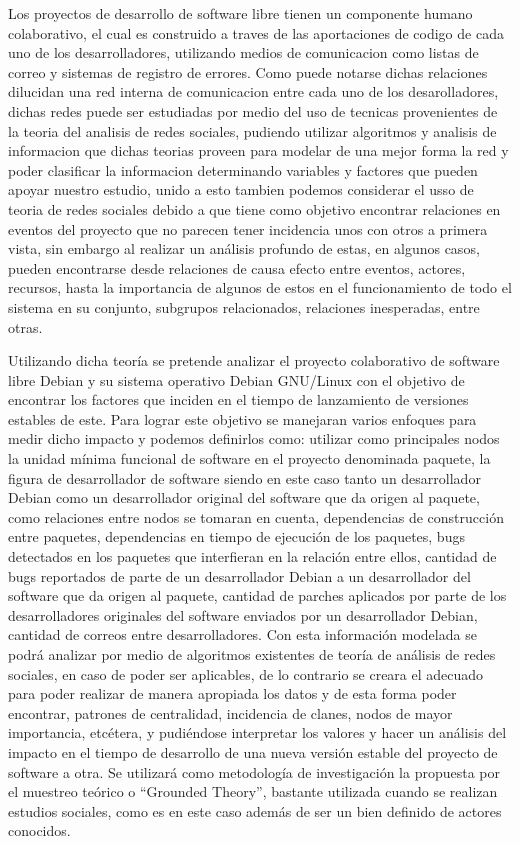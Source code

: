 \documentclass[12pt,titlepage]{report}
\begin{document}
Los proyectos de desarrollo de software libre tienen un componente
humano colaborativo, el cual es construido a traves de las
aportaciones de codigo de cada uno de los desarrolladores, utilizando
medios de comunicacion como listas de correo y sistemas de registro de
errores. Como puede notarse dichas relaciones dilucidan una red
interna de comunicacion entre cada uno de los desarolladores, dichas
redes puede ser estudiadas por medio del uso de tecnicas provenientes
de la teoria del analisis de redes sociales, pudiendo utilizar
algoritmos y analisis de informacion que dichas teorias proveen
para modelar de una mejor forma la red y poder clasificar la
informacion determinando variables y factores que pueden apoyar
nuestro estudio, unido a esto tambien podemos considerar el usso de teoria
de redes sociales  debido a que tiene como objetivo encontrar relaciones en eventos del proyecto que
no parecen tener incidencia unos con otros a primera vista, sin
embargo al realizar un análisis profundo de estas, en algunos casos,
pueden encontrarse desde relaciones de causa efecto entre eventos,
actores, recursos, hasta la importancia de algunos de estos en el
funcionamiento de todo el sistema en su conjunto, subgrupos
relacionados, relaciones inesperadas, entre otras.

Utilizando dicha teoría se pretende analizar el proyecto colaborativo
de software libre Debian y su sistema operativo Debian GNU/Linux con
el objetivo de encontrar los factores que inciden en el tiempo de
lanzamiento de versiones estables de este.  Para lograr este objetivo
se manejaran varios enfoques para medir dicho impacto y podemos
definirlos como: utilizar como principales nodos la unidad mínima
funcional de software en el proyecto denominada paquete, la figura de
desarrollador de software siendo en este caso tanto un desarrollador
Debian como un desarrollador original del software que da origen al
paquete, como relaciones entre nodos se tomaran en cuenta,
dependencias de construcción entre paquetes, dependencias en tiempo de
ejecución de los paquetes, bugs detectados en los paquetes que
interfieran en la relación entre ellos, cantidad de bugs reportados de
parte de un desarrollador Debian a un desarrollador del software que
da origen al paquete, cantidad de parches aplicados por parte de los
desarrolladores originales del software enviados por un desarrollador
Debian, cantidad de correos entre desarrolladores.  Con esta
información modelada se podrá analizar por medio de algoritmos
existentes de teoría de análisis de redes sociales, en caso de poder
ser aplicables, de lo contrario se creara el adecuado para poder
realizar de manera apropiada los datos y de esta forma poder
encontrar, patrones de centralidad, incidencia de clanes, nodos de
mayor importancia, etcétera, y pudiéndose interpretar los valores y
hacer un análisis del impacto en el tiempo de desarrollo de una nueva
versión estable del proyecto de software a otra.  Se utilizará como
metodología de investigación la propuesta por el muestreo teórico o
``Grounded Theory'', bastante utilizada cuando se realizan estudios
sociales, como es en este caso además de ser un bien definido de
actores conocidos.
\end{document}
